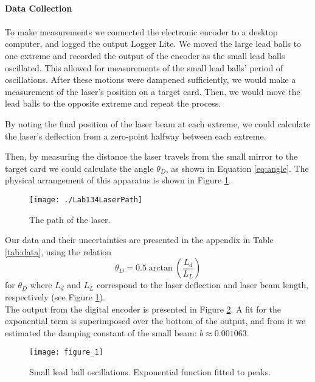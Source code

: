\paragraph{Data Collection}

\paragraph{} To make measurements we connected the electronic encoder to a desktop computer, and logged the output Logger Lite. 
We moved the large lead balls to one extreme and recorded the output of the encoder as the small lead balls oscillated. 
This allowed for measurements of the small lead balls' period of oscillations. After these motions were dampened sufficiently, we would make a measurement of the laser's position on a target card. 
Then, we would move the lead balls to the opposite extreme and repeat the process.

By noting the final position of the laser beam at each extreme, we could calculate the laser's deflection from a zero-point halfway between each extreme. 

Then, by measuring the distance the laser travels from the small mirror to the target card we could calculate the angle \(\theta_D\), as shown in Equation \eqref{eq:angle}. The physical arrangement of this apparatus is shown in Figure \ref{fig:laserpath}. 

\begin{figure}[H]
\centering
\texttt{[image: ./Lab134LaserPath]}
\caption{The path of the laser.}
\label{fig:laserpath}
\end{figure}


Our data and their uncertainties are presented in the appendix in Table \ref{tab:data}, using the relation
\begin{equation}\label{eq:angle}
	\theta_{D} = 0.5\arctan\left(\dfrac{L_{d}}{L_{L}} \right)
	\end{equation}
for \(\theta_{D}\) where \(L_{d}\) and \(L_{L}\) correspond to the laser deflection and laser beam length, respectively (see Figure \ref{fig:laserpath}). \\

The output from the digital encoder is presented in Figure \ref{fig:logger}. 
A fit for the exponential term is superimposed over the bottom of the output, and from it we estimated the damping constant of the small beam: \(b \approx 0.001063 \).

\begin{figure}[H]
\centering
\texttt{[image: figure\_1]}
\caption{Small lead ball oscillations. Exponential function fitted to peaks.}
\label{fig:logger}
\end{figure}

